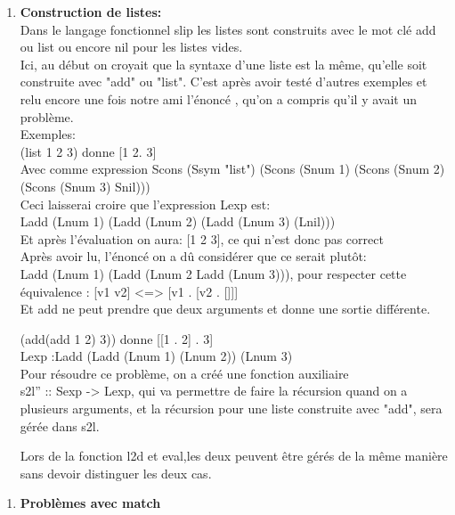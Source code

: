 \documentclass{article}
\begin{document}
\begin{enumerate}
    \item 
    \textbf{Construction de listes:}\\
    Dans le langage fonctionnel slip les listes sont construits avec le mot clé add ou list ou encore nil pour les listes vides.\\
    Ici, au début on croyait que la syntaxe d'une liste est la même, qu'elle soit construite avec "add" ou "list". C'est après avoir testé d'autres exemples et relu encore une fois notre ami l'énoncé , qu'on a compris qu'il y avait un problème.\\
    Exemples:\\
      
      (list 1 2 3) donne  [1 2. 3]\\
      Avec comme expression Scons (Ssym "list") (Scons (Snum 1) (Scons (Snum 2) (Scons (Snum 3) Snil)))\\
      
      Ceci laisserai croire que l'expression Lexp est:\\ Ladd (Lnum 1) (Ladd (Lnum 2) (Ladd (Lnum 3) (Lnil)))\\
      
      Et après l'évaluation on aura: [1 2 3], ce qui n'est donc pas correct\\
      
     Après avoir lu, l'énoncé on a dû considérer que ce serait plutôt:\\
      Ladd (Lnum 1) (Ladd (Lnum 2 Ladd (Lnum 3))), pour respecter cette équivalence : [v1 v2] <=>  [v1 . [v2 . []]]\\
      
     Et add ne peut prendre que deux arguments et donne une sortie différente.
    
    (add(add 1 2) 3)) donne [[1 . 2] . 3] \\Lexp :Ladd (Ladd (Lnum 1) (Lnum 2)) (Lnum 3) \\
    
    Pour résoudre ce problème, on a créé une fonction auxiliaire\\
    s2l'' :: Sexp -> Lexp, qui va permettre de faire la récursion quand on a plusieurs arguments, et la récursion pour une liste construite avec "add", sera gérée dans s2l.
    
    Lors de la fonction l2d et eval,les deux peuvent être gérés de la même manière sans devoir distinguer les deux cas.
    
\end{enumerate}

\begin{enumerate}
    \item 
    \textbf{Problèmes avec match}\\

\end{enumerate}
\end{document}
